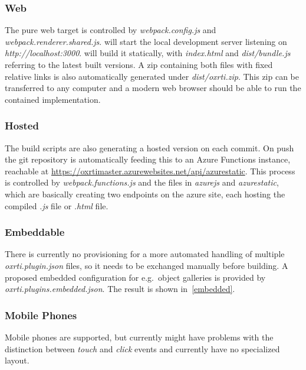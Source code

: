 \subsubsection{Web}
The pure web target is controlled by \emph{webpack.config.js} and
\emph{webpack.renderer.shared.js}.  will start the local
development server listening on \emph{http://localhost:3000}. 
will build it statically, with \emph{index.html} and \emph{dist/bundle.js}
referring to the latest built versions. A zip containing both files with fixed
relative links is also automatically generated under \emph{dist/oxrti.zip}. This
zip can be transferred to any computer and a modern web browser should be able
to run the contained implementation.

\subsubsection{Hosted}
The build scripts are also generating a hosted version on each commit. On push
the git repository\cite*{noauthor_oxrti:_2018} is automatically feeding this to an
Azure Functions instance, reachable at
\url{https://oxrtimaster.azurewebsites.net/api/azurestatic}. This process is
controlled by \emph{webpack.functions.js} and the files in \emph{azurejs} and
\emph{azurestatic}, which are basically creating two endpoints on the azure
site, each hosting the compiled \emph{.js} file or \emph{.html} file.

\subsubsection{Embeddable}
There is currently no provisioning for a more automated handling of multiple
\emph{oxrti.plugin.json} files, so it needs to be exchanged manually before
building. A proposed embedded configuration for e.g.\ object galleries is provided by
\emph{oxrti.plugins.embedded.json}. The result is shown in~\autoref{embedded}.

\subsubsection{Mobile Phones}
Mobile phones are supported, but currently might have
problems with the distinction between \emph{touch} and \emph{click} events and
currently have no specialized layout.
